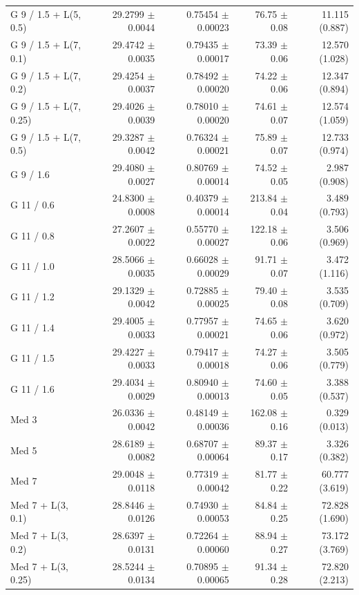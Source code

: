 \begin{longtable}{lrrrr}
G 9 / 1.5 + L(5, 0.5) & 29.2799 $\pm$ 0.0044 & 0.75454 $\pm$ 0.00023 & 76.75 $\pm$ 0.08 & 11.115 (0.887) \\
G 9 / 1.5 + L(7, 0.1) & 29.4742 $\pm$ 0.0035 & 0.79435 $\pm$ 0.00017 & 73.39 $\pm$ 0.06 & 12.570 (1.028) \\
G 9 / 1.5 + L(7, 0.2) & 29.4254 $\pm$ 0.0037 & 0.78492 $\pm$ 0.00020 & 74.22 $\pm$ 0.06 & 12.347 (0.894) \\
G 9 / 1.5 + L(7, 0.25) & 29.4026 $\pm$ 0.0039 & 0.78010 $\pm$ 0.00020 & 74.61 $\pm$ 0.07 & 12.574 (1.059) \\
G 9 / 1.5 + L(7, 0.5) & 29.3287 $\pm$ 0.0042 & 0.76324 $\pm$ 0.00021 & 75.89 $\pm$ 0.07 & 12.733 (0.974) \\
G 9 / 1.6 & 29.4080 $\pm$ 0.0027 & 0.80769 $\pm$ 0.00014 & 74.52 $\pm$ 0.05 & 2.987 (0.908) \\
G 11 / 0.6 & 24.8300 $\pm$ 0.0008 & 0.40379 $\pm$ 0.00014 & 213.84 $\pm$ 0.04 & 3.489 (0.793) \\
G 11 / 0.8 & 27.2607 $\pm$ 0.0022 & 0.55770 $\pm$ 0.00027 & 122.18 $\pm$ 0.06 & 3.506 (0.969) \\
G 11 / 1.0 & 28.5066 $\pm$ 0.0035 & 0.66028 $\pm$ 0.00029 & 91.71 $\pm$ 0.07 & 3.472 (1.116) \\
G 11 / 1.2 & 29.1329 $\pm$ 0.0042 & 0.72885 $\pm$ 0.00025 & 79.40 $\pm$ 0.08 & 3.535 (0.709) \\
G 11 / 1.4 & 29.4005 $\pm$ 0.0033 & 0.77957 $\pm$ 0.00021 & 74.65 $\pm$ 0.06 & 3.620 (0.972) \\
G 11 / 1.5 & 29.4227 $\pm$ 0.0033 & 0.79417 $\pm$ 0.00018 & 74.27 $\pm$ 0.06 & 3.505 (0.779) \\
G 11 / 1.6 & 29.4034 $\pm$ 0.0029 & 0.80940 $\pm$ 0.00013 & 74.60 $\pm$ 0.05 & 3.388 (0.537) \\
Med 3 & 26.0336 $\pm$ 0.0042 & 0.48149 $\pm$ 0.00036 & 162.08 $\pm$ 0.16 & 0.329 (0.013) \\
Med 5 & 28.6189 $\pm$ 0.0082 & 0.68707 $\pm$ 0.00064 & 89.37 $\pm$ 0.17 & 3.326 (0.382) \\
Med 7 & 29.0048 $\pm$ 0.0118 & 0.77319 $\pm$ 0.00042 & 81.77 $\pm$ 0.22 & 60.777 (3.619) \\
Med 7 + L(3, 0.1) & 28.8446 $\pm$ 0.0126 & 0.74930 $\pm$ 0.00053 & 84.84 $\pm$ 0.25 & 72.828 (1.690) \\
Med 7 + L(3, 0.2) & 28.6397 $\pm$ 0.0131 & 0.72264 $\pm$ 0.00060 & 88.94 $\pm$ 0.27 & 73.172 (3.769) \\
Med 7 + L(3, 0.25) & 28.5244 $\pm$ 0.0134 & 0.70895 $\pm$ 0.00065 & 91.34 $\pm$ 0.28 & 72.820 (2.213) \\

\end{longtable}
